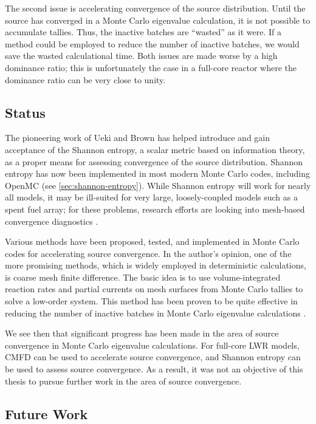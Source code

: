 The second issue is accelerating convergence of the source distribution. Until
the source has converged in a Monte Carlo eigenvalue calculation, it is not
possible to accumulate tallies. Thus, the inactive batches are ``wasted'' as it
were. If a method could be employed to reduce the number of inactive batches, we
would save the wasted calculational time. Both issues are made worse by a high
dominance ratio; this is unfortunately the case in a full-core reactor where the
dominance ratio can be very close to unity.

\subsection{Status}

The pioneering work of Ueki and Brown \cite{trans-ueki-2002, physor-brown-2006}
has helped introduce and gain acceptance of the Shannon entropy, a scalar metric
based on information theory, as a proper means for assessing convergence of the
source distribution. Shannon entropy has now been implemented in most modern
Monte Carlo codes, including OpenMC (see \autoref{sec:shannon-entropy}). While
Shannon entropy will work for nearly all models, it may be ill-suited for very
large, loosely-coupled models such as a spent fuel array; for these problems,
research efforts are looking into mesh-based convergence diagnostics
\cite{mc-she-2011}.

Various methods have been proposed, tested, and implemented in Monte Carlo codes
for accelerating source convergence. In the author's opinion, one of the more
promising methods, which is widely employed in deterministic calculations, is
coarse mesh finite difference. The basic idea is to use volume-integrated
reaction rates and partial currents on mesh surfaces from Monte Carlo tallies to
solve a low-order system. This method has been proven to be quite effective in
reducing the number of inactive batches in Monte Carlo eigenvalue
calculations \cite{physor-lee-2012}.

We see then that significant progress has been made in the area of source
convergence in Monte Carlo eigenvalue calculations. For full-core LWR models,
CMFD can be used to accelerate source convergence, and Shannon entropy can be
used to assess source convergence. As a result, it was not an objective of this
thesis to pursue further work in the area of source convergence.

\subsection{Future Work}

